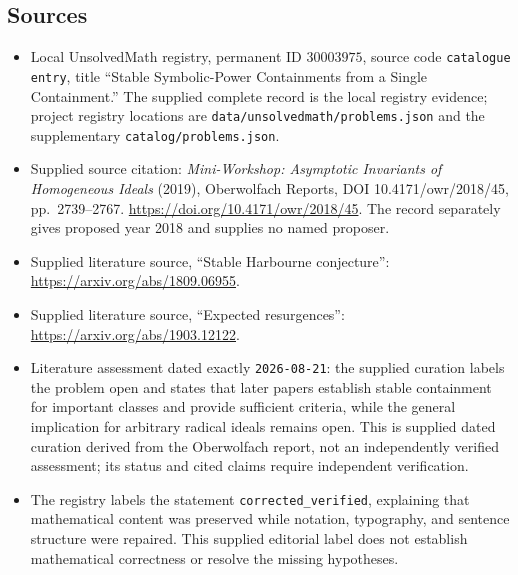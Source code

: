 \documentclass[11pt]{article}
\begin{document}
\subsection{Sources}
\begin{itemize}
\item Local UnsolvedMath registry, permanent ID \(30003975\), source code \texttt{catalogue entry}, title ``Stable Symbolic-Power Containments from a Single Containment.'' The supplied complete record is the local registry evidence; project registry locations are \texttt{data/unsolvedmath/problems.json} and the supplementary \texttt{catalog/problems.json}.
\item Supplied source citation: \emph{Mini-Workshop: Asymptotic Invariants of Homogeneous Ideals} (2019), Oberwolfach Reports, DOI 10.4171/owr/2018/45, pp.\ 2739--2767. \url{https://doi.org/10.4171/owr/2018/45}. The record separately gives proposed year 2018 and supplies no named proposer.
\item Supplied literature source, ``Stable Harbourne conjecture'': \url{https://arxiv.org/abs/1809.06955}.
\item Supplied literature source, ``Expected resurgences'': \url{https://arxiv.org/abs/1903.12122}.
\item Literature assessment dated exactly \texttt{2026-08-21}: the supplied curation labels the problem open and states that later papers establish stable containment for important classes and provide sufficient criteria, while the general implication for arbitrary radical ideals remains open. This is supplied dated curation derived from the Oberwolfach report, not an independently verified assessment; its status and cited claims require independent verification.
\item The registry labels the statement \texttt{corrected\_verified}, explaining that mathematical content was preserved while notation, typography, and sentence structure were repaired. This supplied editorial label does not establish mathematical correctness or resolve the missing hypotheses.
\end{itemize}
\end{document}
